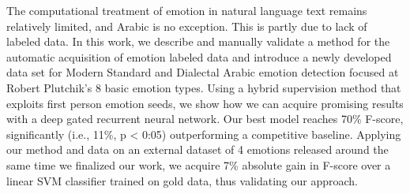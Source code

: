 The computational treatment of emotion in natural language text remains relatively limited, and Arabic is no exception. This is partly due to lack of labeled data. In this work, we describe and manually validate a method for the automatic acquisition of emotion labeled data and introduce a newly developed data set for Modern Standard and Dialectal Arabic emotion detection focused at Robert Plutchik's 8 basic emotion types. Using a hybrid supervision method that exploits first person emotion seeds, we show how we can acquire promising results with a deep gated recurrent neural network. Our best model reaches 70\% F-score, significantly (i.e., 11\%, p < 0:05) outperforming a competitive baseline. Applying our method and data on an external dataset of 4 emotions released around the same time we finalized our work, we acquire 7\% absolute gain in F-score over a linear SVM classifier trained on gold data, thus validating our approach.
